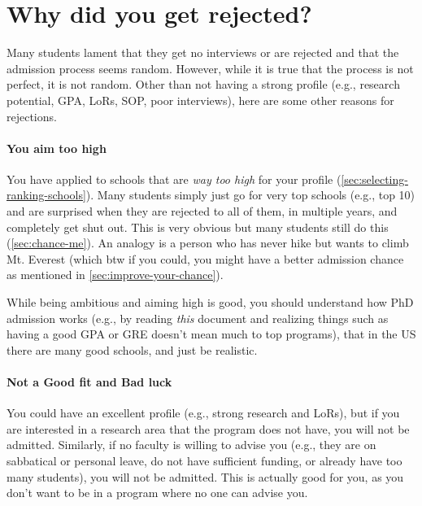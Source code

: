 \documentclass[oneside,11pt,dvipsnames]{book}
\newcommand{\subsectioninfo}[1]{%
  \phantomsection
  \addcontentsline{toc}{subsectioninfo}{\textcolor{black}{\texttt #1}}%
}
\begin{document}
\section{Why did you get rejected?}\label{sec:why-rejected}
\subsectioninfo{You aim too high, are overqualified, or even because you applied to AI/ML, a super competitive field in recent years with many applicants.}

Many students lament that they get no interviews or are rejected and that the admission process seems random.  However, while it is true that the process is not perfect, it is not random.
Other than not having a strong profile (e.g., research potential, GPA, LoRs, SOP, poor interviews), here are some other reasons for rejections.

\paragraph{You aim too high} 
You have applied to schools that are \emph{way too high} for your profile (\autoref{sec:selecting-ranking-schools}). Many students simply just go for very top schools (e.g., top 10) and are surprised when they are rejected to all of them, in multiple years, and completely get shut out.  This is very obvious but many students still do this (\autoref{sec:chance-me}). An analogy is a person who has never hike but wants to climb Mt. Everest (which btw if you could, you might have a better admission chance as mentioned in \autoref{sec:improve-your-chance}).

While being ambitious and aiming high is good, you should understand how PhD admission works (e.g., by reading \emph{this} document and realizing things such as having a good GPA or GRE doesn't mean much to top programs), that in the US there are many good schools, and just be realistic. 

\paragraph{Not a Good fit and Bad luck}  You could have an excellent profile (e.g., strong research and LoRs), but if you are interested in a research area that the program does not have, you will not be admitted.
Similarly, if no faculty is willing to advise you (e.g., they are on sabbatical or personal leave, do not have sufficient funding, or already have too many students), you will not be admitted.  This is actually good for you, as you don't want to be in a program where no one can advise you.
\end{document}
